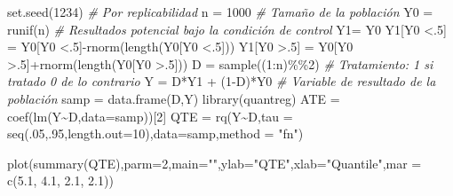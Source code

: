 \documentclass[
]{article}
\newenvironment{Shaded}{\begin{snugshade}}{\end{snugshade}}
\newcommand{\AttributeTok}[1]{\textcolor[rgb]{0.77,0.63,0.00}{#1}}
\newcommand{\CommentTok}[1]{\textcolor[rgb]{0.56,0.35,0.01}{\textit{#1}}}
\newcommand{\DecValTok}[1]{\textcolor[rgb]{0.00,0.00,0.81}{#1}}
\newcommand{\FloatTok}[1]{\textcolor[rgb]{0.00,0.00,0.81}{#1}}
\newcommand{\FunctionTok}[1]{\textcolor[rgb]{0.00,0.00,0.00}{#1}}
\newcommand{\NormalTok}[1]{#1}
\newcommand{\OtherTok}[1]{\textcolor[rgb]{0.56,0.35,0.01}{#1}}
\newcommand{\SpecialCharTok}[1]{\textcolor[rgb]{0.00,0.00,0.00}{#1}}
\newcommand{\StringTok}[1]{\textcolor[rgb]{0.31,0.60,0.02}{#1}}
\begin{document}
\begin{Shaded}
\begin{Highlighting}[]
\FunctionTok{set.seed}\NormalTok{(}\DecValTok{1234}\NormalTok{) }\CommentTok{\# Por replicabilidad}
\NormalTok{n }\OtherTok{=} \DecValTok{1000} \CommentTok{\# Tamaño de la población}
\NormalTok{Y0 }\OtherTok{=} \FunctionTok{runif}\NormalTok{(n) }\CommentTok{\# Resultados potencial bajo la condición de control}
\NormalTok{Y1}\OtherTok{=}\NormalTok{ Y0 }
\NormalTok{Y1[Y0 }\SpecialCharTok{\textless{}}\NormalTok{.}\DecValTok{5}\NormalTok{] }\OtherTok{=}\NormalTok{ Y0[Y0 }\SpecialCharTok{\textless{}}\NormalTok{.}\DecValTok{5}\NormalTok{]}\SpecialCharTok{{-}}\FunctionTok{rnorm}\NormalTok{(}\FunctionTok{length}\NormalTok{(Y0[Y0 }\SpecialCharTok{\textless{}}\NormalTok{.}\DecValTok{5}\NormalTok{])) }
\NormalTok{Y1[Y0 }\SpecialCharTok{\textgreater{}}\NormalTok{.}\DecValTok{5}\NormalTok{] }\OtherTok{=}\NormalTok{ Y0[Y0 }\SpecialCharTok{\textgreater{}}\NormalTok{.}\DecValTok{5}\NormalTok{]}\SpecialCharTok{+}\FunctionTok{rnorm}\NormalTok{(}\FunctionTok{length}\NormalTok{(Y0[Y0 }\SpecialCharTok{\textgreater{}}\NormalTok{.}\DecValTok{5}\NormalTok{])) }
\NormalTok{D }\OtherTok{=} \FunctionTok{sample}\NormalTok{((}\DecValTok{1}\SpecialCharTok{:}\NormalTok{n)}\SpecialCharTok{\%\%}\DecValTok{2}\NormalTok{) }\CommentTok{\# Tratamiento: 1 si tratado 0 de lo contrario }
\NormalTok{Y }\OtherTok{=}\NormalTok{ D}\SpecialCharTok{*}\NormalTok{Y1 }\SpecialCharTok{+}\NormalTok{ (}\DecValTok{1}\SpecialCharTok{{-}}\NormalTok{D)}\SpecialCharTok{*}\NormalTok{Y0 }\CommentTok{\# Variable de resultado de la población }
\NormalTok{samp }\OtherTok{=} \FunctionTok{data.frame}\NormalTok{(D,Y) }
\FunctionTok{library}\NormalTok{(quantreg) }
\NormalTok{ATE }\OtherTok{=} \FunctionTok{coef}\NormalTok{(}\FunctionTok{lm}\NormalTok{(Y}\SpecialCharTok{\textasciitilde{}}\NormalTok{D,}\AttributeTok{data=}\NormalTok{samp))[}\DecValTok{2}\NormalTok{] }
\NormalTok{QTE }\OtherTok{=} \FunctionTok{rq}\NormalTok{(Y}\SpecialCharTok{\textasciitilde{}}\NormalTok{D,}\AttributeTok{tau =} 
\FunctionTok{seq}\NormalTok{(.}\DecValTok{05}\NormalTok{,.}\DecValTok{95}\NormalTok{,}\AttributeTok{length.out=}\DecValTok{10}\NormalTok{),}\AttributeTok{data=}\NormalTok{samp,}\AttributeTok{method =} \StringTok{"fn"}\NormalTok{) }

\FunctionTok{plot}\NormalTok{(}\FunctionTok{summary}\NormalTok{(QTE),}\AttributeTok{parm=}\DecValTok{2}\NormalTok{,}\AttributeTok{main=}\StringTok{""}\NormalTok{,}\AttributeTok{ylab=}\StringTok{"QTE"}\NormalTok{,}\AttributeTok{xlab=}\StringTok{"Quantile"}\NormalTok{,}\AttributeTok{mar =} \FunctionTok{c}\NormalTok{(}\FloatTok{5.1}\NormalTok{, }\FloatTok{4.1}\NormalTok{, }\FloatTok{2.1}\NormalTok{, }\FloatTok{2.1}\NormalTok{)) }
\end{Highlighting}
\end{Shaded}
\end{document}
